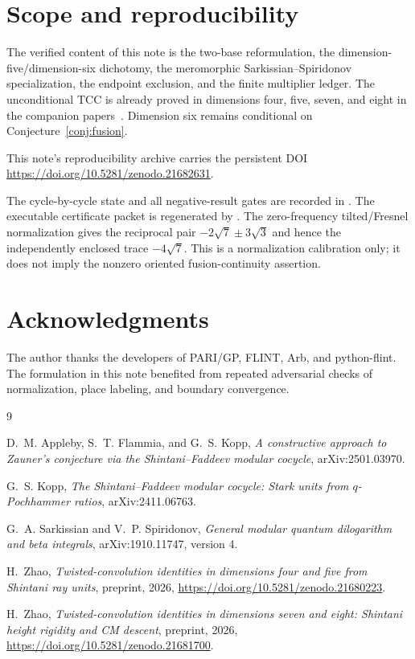 \documentclass[11pt]{article}
\begin{document}
\section{Scope and reproducibility}

The verified content of this note is the two-base reformulation,
the dimension-five/dimension-six dichotomy, the meromorphic
Sarkissian--Spiridonov specialization, the endpoint exclusion, and the
finite multiplier ledger.  The unconditional TCC is already proved in
dimensions four, five, seven, and eight in the companion
papers~\cite{PaperI,PaperII}.  Dimension six remains conditional on
Conjecture~\ref{conj:fusion}.

This note's reproducibility archive carries the persistent DOI
\url{https://doi.org/10.5281/zenodo.21682631}.

The cycle-by-cycle state and all negative-result gates are recorded in
.  The executable certificate
packet is regenerated by
.
The zero-frequency tilted/Fresnel normalization gives the reciprocal
pair $-2\sqrt7\pm3\sqrt3$ and hence the independently enclosed trace
$-4\sqrt7$.  This is a normalization calibration only; it does not
imply the nonzero oriented fusion-continuity assertion.

\section*{Acknowledgments}

The author thanks the developers of PARI/GP, FLINT, Arb, and
python-flint.  The formulation in this note benefited from repeated
adversarial checks of normalization, place labeling, and boundary
convergence.

\begin{thebibliography}{9}

D.~M. Appleby, S.~T. Flammia, and G.~S. Kopp,
\emph{A constructive approach to Zauner's conjecture via the
Shintani--Faddeev modular cocycle},
arXiv:2501.03970.

G.~S. Kopp,
\emph{The Shintani--Faddeev modular cocycle: Stark units from
$q$-Pochhammer ratios},
arXiv:2411.06763.

G.~A. Sarkissian and V.~P. Spiridonov,
\emph{General modular quantum dilogarithm and beta integrals},
arXiv:1910.11747, version 4.

H.~Zhao,
\emph{Twisted-convolution identities in dimensions four and five
from Shintani ray units}, preprint, 2026,
\url{https://doi.org/10.5281/zenodo.21680223}.

H.~Zhao,
\emph{Twisted-convolution identities in dimensions seven and eight:
Shintani height rigidity and CM descent}, preprint, 2026,
\url{https://doi.org/10.5281/zenodo.21681700}.

\end{thebibliography}
\end{document}
